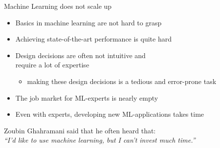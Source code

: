 \begin{frame}[c]{Machine Learning does not scale up}

\begin{itemize}
  \item Basics in machine learning are not hard to grasp
  \smallskip
  \pause
  \item Achieving state-of-the-art performance is quite hard
  \smallskip
  \pause
  \item Design decisions are often not intuitive and\\ require a lot of expertise
  \begin{itemize}
    \item making these design decisions is a tedious and error-prone task
  \end{itemize}
  \smallskip
  \pause
  \smallskip
  \item The job market for ML-experts is nearly empty
  \smallskip
  \pause
  \item Even with experts, developing new ML-applications takes time
\end{itemize}

\pause
\bigskip

Zoubin Ghahramani said that he often heard that:\\
\hfill \textit{``I'd like to use machine learning, but I can't invest much time.''}



\end{frame}






